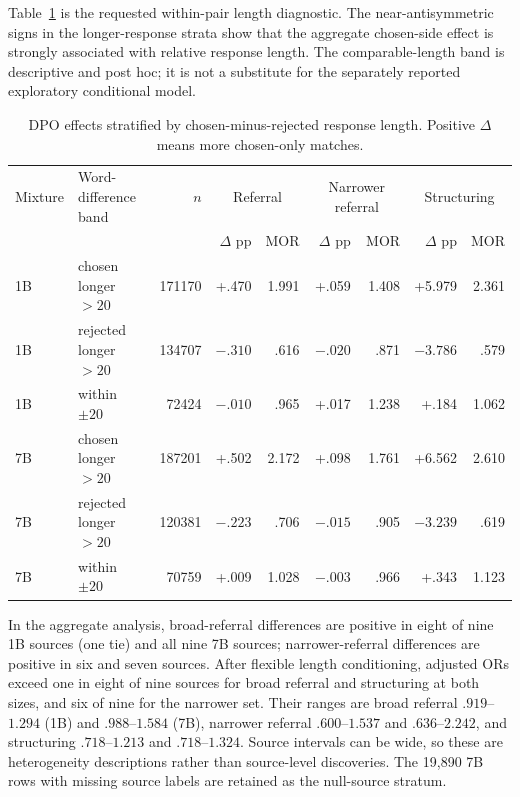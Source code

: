 \documentclass[11pt]{article}
\begin{document}
Table~\ref{tab:dpo-length} is the requested within-pair length diagnostic. The
near-antisymmetric signs in the longer-response strata show that the aggregate
chosen-side effect is strongly associated with relative response length. The
comparable-length band is descriptive and post hoc; it is not a substitute for
the separately reported exploratory conditional model.

\begin{table}[h]
\centering
\footnotesize
\setlength{\tabcolsep}{3pt}
\begin{tabular}{llrrrrrrr}
\toprule
Mixture & Word-difference band & $n$ & \multicolumn{2}{c}{Referral} &
\multicolumn{2}{c}{Narrower referral} & \multicolumn{2}{c}{Structuring} \\
 & & & $\Delta$ pp & MOR & $\Delta$ pp & MOR & $\Delta$ pp & MOR \\
\midrule
1B & chosen longer $>20$ & 171170 & +.470 & 1.991 & +.059 & 1.408 & +5.979 & 2.361 \\
1B & rejected longer $>20$ & 134707 & $-.310$ & .616 & $-.020$ & .871 & $-3.786$ & .579 \\
1B & within $\pm20$ & 72424 & $-.010$ & .965 & +.017 & 1.238 & +.184 & 1.062 \\
\midrule
7B & chosen longer $>20$ & 187201 & +.502 & 2.172 & +.098 & 1.761 & +6.562 & 2.610 \\
7B & rejected longer $>20$ & 120381 & $-.223$ & .706 & $-.015$ & .905 & $-3.239$ & .619 \\
7B & within $\pm20$ & 70759 & +.009 & 1.028 & $-.003$ & .966 & +.343 & 1.123 \\
\bottomrule
\end{tabular}
\caption{DPO effects stratified by chosen-minus-rejected response length.
Positive $\Delta$ means more chosen-only matches.}
\label{tab:dpo-length}
\end{table}

In the aggregate analysis, broad-referral differences are positive in eight of
nine 1B sources (one tie) and all nine 7B sources; narrower-referral differences
are positive in six and seven sources. After flexible length conditioning,
adjusted ORs exceed one in eight of nine sources for broad referral and
structuring at both sizes, and six of nine for the narrower set. Their ranges
are broad referral $.919$--$1.294$ (1B) and $.988$--$1.584$ (7B), narrower
referral $.600$--$1.537$ and $.636$--$2.242$, and structuring $.718$--$1.213$
and $.718$--$1.324$. Source intervals can be wide, so these are heterogeneity
descriptions rather than source-level discoveries. The 19{,}890 7B rows with
missing source labels are retained as the null-source stratum.
\end{document}
